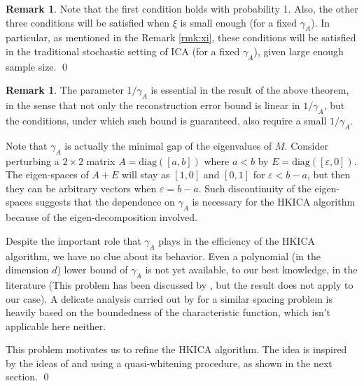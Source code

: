 \documentclass[twoside]{article}
\theoremstyle{definition}
\newtheorem{remark}[lemma]{Remark}
\newcommand{\eps}{\varepsilon}
\begin{document}
\begin{remark}
Note that the first condition holds with probability 1. Also, the other three conditions will be satisfied when $\xi$ is small enough (for a fixed $\gamma_A$).
In particular, as mentioned in the Remark \ref{rmk:xi}, these conditions will be satisfied in the traditional stochastic setting of ICA (for a fixed $\gamma_A$), given large enough sample size. \qed
\end{remark}
\fi
\begin{remark}
The parameter $1/\gamma_A$ is essential in the result of the above theorem, in the sense that not only the reconstruction error bound is linear in $1/\gamma_A$, but the conditions, under which such bound is guaranteed, also require a small $1/\gamma_A$.

Note that $\gamma_A$ is actually the minimal gap of the eigenvalues of $M$.
Consider perturbing a $2\times 2$ matrix $A = \text{diag}([a,b])$ where $a<b$ by $E = \text{diag}([\eps,0])$. 
The eigen-spaces of $A+E$ will stay as $[1,0]$ and $[0,1]$ for $\eps < b-a$, but then they can be arbitrary vectors when $\eps = b-a$.  
Such discontinuity of the eigen-spaces suggests that the dependence on $\gamma_A$ is necessary for the HKICA algorithm because of the eigen-decomposition involved. 

Despite the important role that $\gamma_A$ plays in the efficiency of the HKICA algorithm, we have no clue about its behavior. 
Even a polynomial (in the dimension $d$) lower bound of $\gamma_A$ is not yet available, to our best knowledge, in the literature (This problem has been discussed by \citet{husler1987minimal}, but the result does not apply to our case).
A delicate analysis carried out by \citet{goyal2014fourier} for a similar spacing problem is heavily based on the boundedness of the characteristic function, which isn't applicable here neither. 

This problem motivates us to refine the HKICA algorithm.
The idea is inspired by the ideas of \citet{arora2012provable} and \citet{frieze1996learning} using a quasi-whitening procedure, as shown in the next section. \qed
\end{remark}
\end{document}
